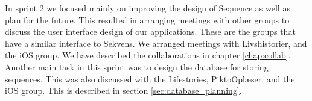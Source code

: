 In sprint 2 we focused mainly on improving the design of Sequence as well as plan for the future. 
This resulted in arranging meetings with other groups to discuss the user interface design of our applications. These are the groups that have a similar interface to Sekvens. We arranged meetings with Livshistorier, and the iOS group. We have described the collaborations in chapter \ref{chap:collab}. Another main task in this sprint was to design the database for storing sequences. This was also discussed with the Lifestories, PiktoOplæser, and the iOS group. This is described in  section \ref{sec:database_planning}.
